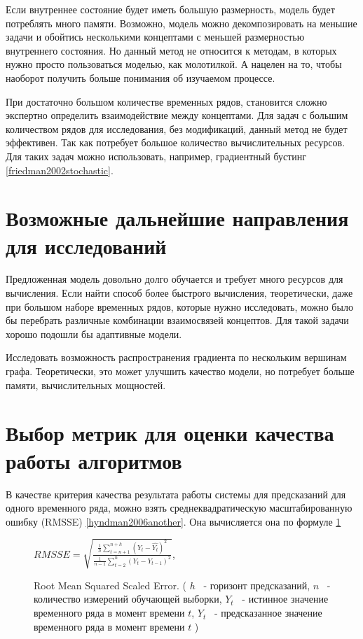 Если внутреннее состояние будет иметь большую размерность,
модель будет потреблять много памяти. Возможно, модель можно
декомпозировать на меньшие задачи и обойтись несколькими концептами
с меньшей размерностью внутреннего состояния.
Но данный метод не относится к методам, в которых нужно просто
пользоваться моделью, как молотилкой. А нацелен на то, чтобы наоборот
получить больше понимания об изучаемом процессе.

При достаточно большом количестве временных рядов,
становится сложно экспертно определить взаимодействие между концептами.
Для задач с большим количеством рядов для исследования, без
модификаций, данный метод не будет эффективен. Так как потребует
большое количество вычислительных ресурсов.
Для таких задач можно использовать, например, градиентный бустинг \ref{friedman2002stochastic}.

\section{Возможные дальнейшие направления для исследований}

Предложенная модель довольно долго обучается и требует много ресурсов
для вычисления. Если найти способ более быстрого вычисления,
теоретически, даже при большом наборе временных рядов, которые нужно
исследовать, можно было бы перебрать различные комбинации взаимосвязей концептов.
Для такой задачи хорошо подошли бы адаптивные модели.

Исследовать возможность распространения градиента по нескольким вершинам
графа. Теоретически, это может улучшить качество модели, но потребует больше
памяти, вычислительных мощностей.

\section{Выбор метрик для оценки качества работы алгоритмов}

В качестве критерия качества результата работы системы для предсказаний
для одного временного ряда, можно взять среднеквадратическую
масштабированную ошибку (RMSSE) \ref{hyndman2006another}.
Она вычисляется она по формуле \ref{img:rmsse}

\def\figurename{Формула}
\begin{figure}
	\centering
	$ RMSSE = \sqrt{ \frac{ \frac{1}{h} \sum_{t=n+1}^{n+h}(Y_t - \hat{Y_t})^2  }{ \frac{1}{n-1} \sum_{t=2}^{n} (Y_t - Y_{t-1})^2 } } $,

	\caption{Root Mean Squared Scaled Error.
	(
		$ h $ ~- горизонт предсказаний,
		$ n $ ~- количество измерений обучающей выборки,
		$ Y_t $ ~- истинное значение временного ряда в момент времени $ t $,
		$ \hat{Y_t} $ ~- предсказанное значение временного ряда в момент времени $ t $
	)}
	\label{img:rmsse}
\end{figure}
\def\figurename{Рис.}

